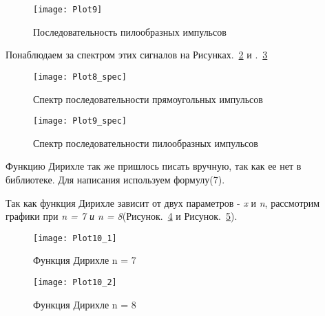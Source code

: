 \begin{figure}[H]
	\begin{center}
		\texttt{[image: Plot9]}
		\caption{Последовательность пилообразных импульсов} 
		\label{pic:Plot9} %
	\end{center}
\end{figure}

Понаблюдаем за спектром этих сигналов на Рисунках.~\ref{pic:Plot8_spec} и .~\ref{pic:Plot9_spec}
\begin{figure}[H]
	\begin{center}
		\texttt{[image: Plot8\_spec]}
		\caption{Спектр последовательности прямоугольных импульсов} 
		\label{pic:Plot8_spec} %
	\end{center}
\end{figure}

\begin{figure}[H]
	\begin{center}
		\texttt{[image: Plot9\_spec]}
		\caption{Спектр последовательности пилообразных импульсов} 
		\label{pic:Plot9_spec} %
	\end{center}
\end{figure}

Функцию Дирихле так же пришлось писать вручную, так как ее нет в библиотеке. Для написания используем формулу(7).


\parindent=1cm %

Так как функция Дирихле зависит от двух параметров - \textit{x} и \textit{n}, рассмотрим графики при \textit{n = 7  и n = 8}(Рисунок.~\ref{pic:Plot10_1} и Рисунок.~\ref{pic:Plot10_2}).

\begin{figure}[H]
	\begin{center}
		\texttt{[image: Plot10\_1]}
		\caption{Функция Дирихле n = 7} 
		\label{pic:Plot10_1} %
	\end{center}
\end{figure}

\begin{figure}[H]
	\begin{center}
		\texttt{[image: Plot10\_2]}
		\caption{Функция Дирихле n = 8} 
		\label{pic:Plot10_2} %
	\end{center}
\end{figure}

